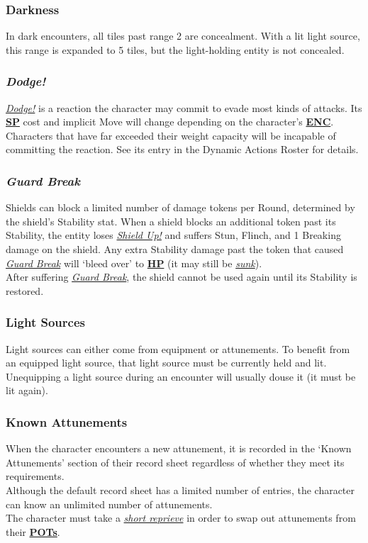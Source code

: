 \documentclass[12pt]{article}
\newcommand{\refto}[1]{\hyperlink{#1}{\textbf{#1}}}
\newcommand{\reftoit}[1]{\hyperlink{#1}{\emph{#1}}}
\begin{document}
\begin{multicols*}{2}
\subsubsection{Darkness}
In dark encounters, all tiles past range 2 are concealment. With a lit light source, this range is expanded to 5 tiles, but the light-holding entity is not concealed.

\subsubsection{\emph{Dodge!}}
\hypertarget{Dodge!}{}
\reftoit{Dodge!} is a reaction the character may commit to evade most kinds of attacks. Its \refto{SP} cost and implicit Move will change depending on the character’s \refto{ENC}. Characters that have far exceeded their weight capacity will be incapable of committing the reaction. See its entry in the Dynamic Actions Roster for details.

\subsubsection{\emph{Guard Break}}
\hypertarget{Guard Break}{}
Shields can block a limited number of damage tokens per Round, determined by the shield’s Stability stat. When a shield blocks an additional token past its Stability, the entity loses \reftoit{Shield Up!} and suffers Stun, Flinch, and 1 Breaking damage on the shield. Any extra Stability damage past the token that caused \reftoit{Guard Break} will ‘bleed over’ to \refto{HP} (it may still be \reftoit{sunk}).\\
After suffering \reftoit{Guard Break}, the shield cannot be used again until its Stability is restored.

\subsubsection{Light Sources}
Light sources can either come from equipment or attunements. To benefit from an equipped light source, that light source must be currently held and lit.\\
Unequipping a light source during an encounter will usually douse it (it must be lit again).

\subsubsection{Known Attunements}
When the character encounters a new attunement, it is recorded in the ‘Known Attunements’ section of their record sheet regardless of whether they meet its requirements.\\
Although the default record sheet has a limited number of entries, the character can know an unlimited number of attunements.\\
The character must take a \reftoit{short reprieve} in order to swap out attunements from their \refto{POTs}.


\end{multicols*}
\end{document}
